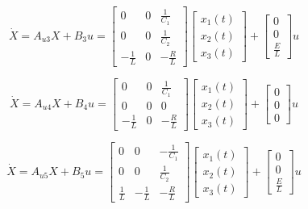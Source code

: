\begin{equation}
	\dot{X}=A_{u3}X+B_{3}u=
	\left[
		\begin{array}{ccc}
			0&0&\frac{1}{C_1} \\
			0&0&\frac{1}{C_2} \\
			-\frac{1}{L}&0&-\frac{R}{L} 
		\end{array}
	\right]
	\left[
		\begin{array}{c}
			x_1(t)\\
			x_2(t)\\
			x_3(t)
		\end{array}
	\right]
	+
	\left[
		\begin{array}{c}
			0\\
			0\\
			\frac{E}{L}
		\end{array}
	\right]
	u
\end{equation}

\begin{equation}
	\dot{X}=A_{u4}X+B_{4}u=
	\left[
		\begin{array}{ccc}
			0&0&\frac{1}{C_1} \\
			0&0&0 \\
			-\frac{1}{L}&0&-\frac{R}{L} 
		\end{array}
	\right]
	\left[
		\begin{array}{c}
			x_1(t)\\
			x_2(t)\\
			x_3(t)
		\end{array}
	\right]
	+
	\left[
		\begin{array}{c}
			0\\
			0\\
			0
		\end{array}
	\right]
	u
\end{equation}

\begin{equation}
	\dot{X}=A_{u5}X+B_{5}u=
	\left[
		\begin{array}{ccc}
			0&0&-\frac{1}{C_1} \\
			0&0&\frac{1}{C_2} \\
			\frac{1}{L}&-\frac{1}{L}&-\frac{R}{L} 
		\end{array}
	\right]
	\left[
		\begin{array}{c}
			x_1(t)\\
			x_2(t)\\
			x_3(t)
		\end{array}
	\right]
	+
	\left[
		\begin{array}{c}
			0\\
			0\\
			\frac{E}{L}
		\end{array}
	\right]
	u
\end{equation}

